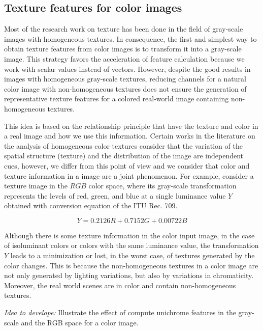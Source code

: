 \subsection{Texture features for color images}

Most of the research work on texture has been done in the field of gray-scale images with homogeneous textures. In consequence, the first and simplest way to obtain texture features from color images is to transform it into a gray-scale image. This strategy favors the acceleration of feature calculation because we work with scalar values instead of vectors. However, despite the good results in images with homogeneous gray-scale textures, reducing channels for a natural color image with non-homogeneous textures does not ensure the generation of representative texture features for a colored real-world image containing non-homogeneous textures.

This idea is based on the relationship principle that have the texture and color in a real image and how we use this information. Certain works in the literature on the analysis of homogeneous color textures consider that the variation of the spatial structure (texture) and the distribution of the image are independent cues, however, we differ from this point of view and we consider that  color and texture information in a image are a joint phenomenon. For example, consider a texture image in the $RGB$ color space, where its gray-scale transformation represents the levels of red, green, and blue at a single luminance value $Y$ obtained with conversion equation of the ITU Rec. 709.

\begin{equation}\label{eq:color2gray_formula}
    Y = 0.2126 R + 0.7152 G + 0.00722 B
\end{equation}
 
Although there is some texture information in the color input image, in the case of isoluminant colors or colors with the same luminance value, the transformation $Y$ leads to a minimization or lost, in the worst case, of textures generated by the color changes. This is because the non-homogeneous textures in a color image are not only generated by lighting variations, but also by variations in chromaticity. Moreover, the real world scenes are in color and contain non-homogeneous textures.

\textit{Idea to develope:} Illustrate the effect of compute unichrome features in the gray-scale and the RGB space for a color image.

